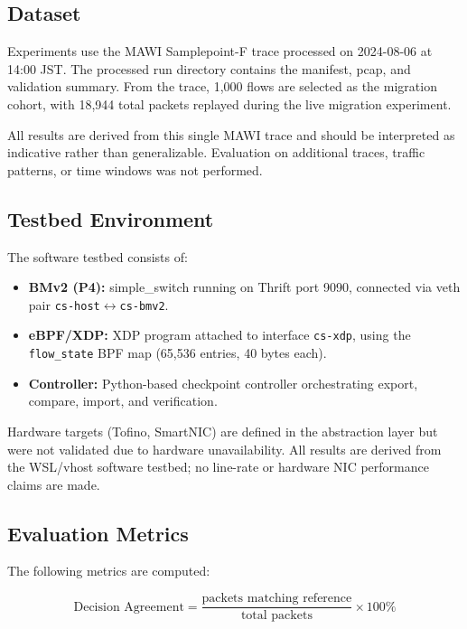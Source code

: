 \documentclass[10pt, conference, compsoc]{IEEEtran}
\begin{document}
\subsection{Dataset}
\label{subsec:dataset}
Experiments use the MAWI Samplepoint-F trace processed on 2024-08-06 at 14:00
JST. The processed run directory contains the manifest, pcap, and validation
summary. From the trace, 1{,}000 flows are selected as the migration cohort,
with 18{,}944 total packets replayed during the live migration experiment.

All results are derived from this single MAWI trace and should be interpreted
as indicative rather than generalizable. Evaluation on additional traces,
traffic patterns, or time windows was not performed.

\subsection{Testbed Environment}
\label{subsec:testbed}
The software testbed consists of:
\begin{itemize}
    \item \textbf{BMv2 (P4):} simple\_switch running on Thrift port 9090,
          connected via veth pair \texttt{cs-host}$\leftrightarrow$\texttt{cs-bmv2}.
    \item \textbf{eBPF/XDP:} XDP program attached to interface \texttt{cs-xdp},
          using the \texttt{flow\_state} BPF map (65{,}536 entries, 40 bytes
          each).
    \item \textbf{Controller:} Python-based checkpoint controller orchestrating
          export, compare, import, and verification.
\end{itemize}

Hardware targets (Tofino, SmartNIC) are defined in the abstraction layer but
were not validated due to hardware unavailability. All results are derived from
the WSL/vhost software testbed; no line-rate or hardware NIC performance claims
are made.

\subsection{Evaluation Metrics}
\label{subsec:metrics}
The following metrics are computed:

\begin{equation}
    \text{Decision Agreement} =
    \frac{\text{packets matching reference}}{\text{total packets}} \times 100\%
\label{eq:decision_agreement}
\end{equation}
\end{document}
